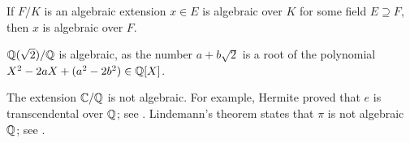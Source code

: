 If $F/K$ is an algebraic extension $x\in E$ is algebraic
over $K$ for some field $E\supseteq F$, 
then $x$ is algebraic over $F$. 

\begin{example}
	$\mathbb{Q}(\sqrt{2})/\mathbb{Q}$ is algebraic, as the number
	$a+b\sqrt{2}$ is a root of the polynomial
	$X^2-2aX+(a^2-2b^2)\in\mathbb{Q}[X]$. 
\end{example}

The extension $\mathbb{C}/\mathbb{Q}$ is not algebraic. For example, Hermite proved 
that $e$ is transcendental 
over $\mathbb{Q}$; see \cite[Therem 24.4]{MR3379917}. Lindemann's theorem 
states that $\pi$ is 
not algebraic $\mathbb{Q}$; see \cite[Theorem 24.5]{MR3379917}. 
